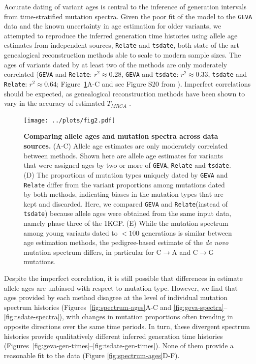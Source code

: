 \documentclass[]{article}
\newcommand{\GEVA}{\texttt{GEVA}\xspace}
\newcommand{\tsdate}{\texttt{tsdate}\xspace}
\newcommand{\relate}{\texttt{Relate}\xspace}
\begin{document}
Accurate dating of variant ages is central to the inference of generation
intervals from time-stratified mutation spectra.  Given the poor fit of the
model to the \GEVA data and the known uncertainty in age estimation for older
variants, we attempted to reproduce the inferred generation time histories
using allele age estimates from independent sources, \relate
\citep{speidel2019method} and \tsdate \citep{wohns2022unified}, both
state-of-the-art genealogical reconstruction methods able to scale to modern
sample sizes.  The ages of variants dated by at least two of the methods are
only moderately correlated (\GEVA and \relate: $r^2 \approx 0.28$, \GEVA and
\tsdate: $r^2 \approx 0.33$, \tsdate and \relate: $r^2 \approx 0.64$;
Figure~\ref{fig:data-comp}A-C and see Figure S20 from
\citet{wohns2022unified}). Imperfect correlations should be expected, as
genealogical reconstruction methods have been shown to vary in the accuracy of
estimated $T_{MRCA}$ \citep{brandt2022evaluation}.

\begin{figure}[t!]
    \centering
    \texttt{[image: ../plots/fig2.pdf]}
    \caption{
        \textbf{Comparing allele ages and mutation spectra across data
        sources.} (A-C) Allele age estimates are only moderately correlated
        between methods. Shown here are allele age estimates for variants that
        were assigned ages by two or more of \GEVA, \relate and \tsdate. (D)
        The proportions of mutation types uniquely dated by \GEVA and \relate
        differ from the variant proportions among mutations dated by both
        methods, indicating biases in the mutation types that are kept and
        discarded. Here, we compared \GEVA and \relate (instead of \tsdate)
        because allele ages were obtained from the same input data, namely
        phase three of the 1KGP.
        (E) While the mutation spectrum among young variants dated
        to $<100$ generations is similar between age estimation methods,
        the pedigree-based estimate of the \emph{de novo} mutation spectrum
        \citep{jonsson2017parental} differs, in particular for C$\rightarrow$A
        and C$\rightarrow$G mutations.
    }
    \label{fig:data-comp}
\end{figure}

Despite the imperfect correlation, it is still possible that differences in
estimate allele ages are unbiased with respect to mutation type. However, we
find that ages provided by each method disagree at the level of individual
mutation spectrum histories (Figures~\ref{fig:spectrum-ages}A-C and
\ref{fig:geva-spectra}--\ref{fig:tsdate-spectra}), with changes in mutation
proportions often trending in opposite directions over the same time periods.
In turn, these divergent spectrum histories provide qualitatively different
inferred generation time histories
(Figures~\ref{fig:geva-gen-times}--\ref{fig:tsdate-gen-times}). None of them
provide a reasonable fit to the data (Figure \ref{fig:spectrum-ages}D-F).
\end{document}
